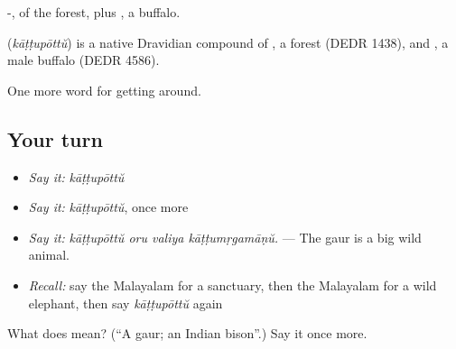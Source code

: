-, of the forest, plus , a buffalo.

\begin{cousinweb}
\textbf{} (\emph{kāṭṭupōttŭ}) is a native Dravidian compound of , a forest (DEDR 1438), and , a male buffalo (DEDR 4586).
\end{cousinweb}

\begin{grammarlens}[title={What you've built}]
One more word for getting around.
\end{grammarlens}

\subsection*{Your turn}
\begin{itemize}
\raggedright
  \item \emph{Say it:} \emph{kāṭṭupōttŭ}
  \item \emph{Say it:} \emph{kāṭṭupōttŭ}, once more
  \item \emph{Say it:} \emph{kāṭṭupōttŭ oru valiya kāṭṭumṛgamāṇŭ.} — The gaur is a big wild animal.
  \item \emph{Recall:} say the Malayalam for a sanctuary, then the Malayalam for a wild elephant, then say \emph{kāṭṭupōttŭ} again
\end{itemize}

\begin{tcolorbox}[breakable,colback=teal!4,colframe=teal!35!black,title={Before you move on}]
What does  mean? (\textquotedblleft{}A gaur; an Indian bison\textquotedblright{}.) Say it once more.
\end{tcolorbox}
